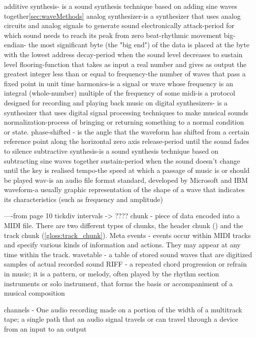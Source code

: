 additive synthesis- is a sound synthesis technique based on adding sine waves together\ref{sec:waveMethods}
analog synthesizer-is a synthesizer that uses analog circuits and analog signals to generate sound electronically
attack-period for which sound needs to reach its peak from zero
beat-rhythmic movement
big-endian- the most significant byte (the "big end") of the data is placed at the byte with the lowest address
decay-period when the sound level decreases to sustain level
flooring-function that takes as input a real number and gives as output the greatest integer less than or equal to
frequency-the number of waves that pass a fixed point in unit time
harmonics-is a signal or wave whose frequency is an integral (whole-number) multiple of the frequency of some
midi-is a protocol designed for recording and playing back music on digital synthesizers- is a synthesizer that uses digital signal processing techniques to make musical sounds
normalization-process of bringing or returning something to a normal condition or state.
phase-shifted - is the angle that the waveform has shifted from a certain reference point along the horizontal zero axis
release-period until the sound fades to silence
subtractive synthesis-is a sound synthesis technique based on subtracting sine waves together
sustain-period when the sound doesn't change until the key is realised 
tempo-the speed at which a passage of music is or should be played
wav-is an audio file format standard, developed by Microsoft and IBM
waveform-a usually graphic representation of the shape of a wave that indicates its characteristics (such as frequency and amplitude)

\label{sec:Blah}








----from page 10
tickdiv intervals -> ????
chunk - piece of data encoded into a MIDI file. There are two different types of chunks, the header chunk () and the track chunk (\ref{gloss:track_chunk}).  
Meta events - events occur within MIDI tracks and specify various kinds of information and actions. They may appear at any time within the track. 
wavetable - a table of stored sound waves that are digitized samples of actual recorded sound
RIFF - a repeated chord progression or refrain in music; it is a pattern, or melody, often played by the rhythm section instruments or solo instrument, that forms the basis or accompaniment of a musical composition

channels - One audio recording made on a portion of the width of a multitrack tape; a single path that an audio signal travels or can travel through a device from an input to an output

